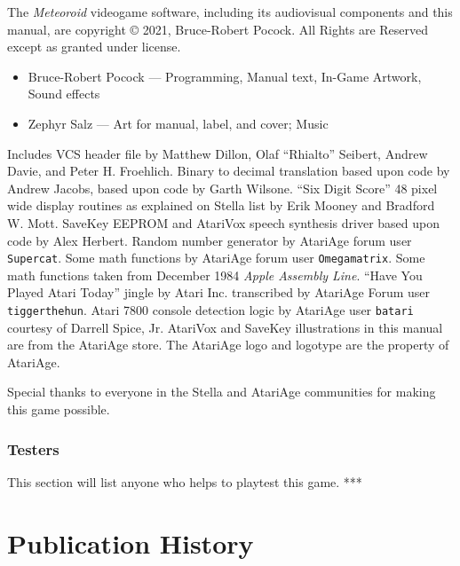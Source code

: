 \documentclass[10pt,twocolumn,openany,article]{memoir}
\begin{document}
{\small

  The  \textit{Meteoroid} videogame  software,  including its  audiovisual
components   and  this   manual,   are   copyright  \copyright{}   2021,
Bruce-Robert  Pocock.   All  Rights  are  Reserved   except  as  granted
under license.

\begin{itemize}
\item Bruce-Robert Pocock --- Programming, Manual text, In-Game Artwork,
  Sound effects
\item Zephyr Salz --- Art for manual, label, and cover; Music
\end{itemize}

\bigskip


Includes VCS  header file by  Matthew Dillon, Olaf  ``Rhialto'' Seibert,
Andrew  Davie, and  Peter H.  Froehlich. Binary  to decimal  translation
based upon  code by  Andrew Jacobs,  based upon  code by  Garth Wilsone.
``Six  Digit Score''  48 pixel  wide  display routines  as explained  on
Stella list  by Erik  Mooney and  Bradford W.  Mott. SaveKey  EEPROM and
AtariVox  speech  synthesis driver  based  upon  code by  Alex  Herbert.
Random  number  generator  by  AtariAge  forum  user  \texttt{Supercat}.
Some  math  functions  by AtariAge  forum  user  \texttt{Omega\-matrix}.
Some  math functions  taken  from December  1984 \textit{Apple  Assembly
  Line}.  ``Have  You   Played  Atari  Today''  jingle   by  Atari  Inc.
transcribed by AtariAge Forum user \texttt{tigger\-the\-hun}. Atari 7800
console  detection logic  by AtariAge  user \texttt{batari}  courtesy of
Darrell Spice, Jr. AtariVox and SaveKey illustrations in this manual are
from  the AtariAge  store.  \ifdefined\DEMO\else The  AtariAge logo  and
logotype are the property of AtariAge. \fi

Special thanks  to everyone in  the Stella and AtariAge  communities for
making this game possible.

\subsection{Testers}


This section will list anyone who helps to playtest this game. ***

}


\vfill

\chapter*{Publication History}
\end{document}
